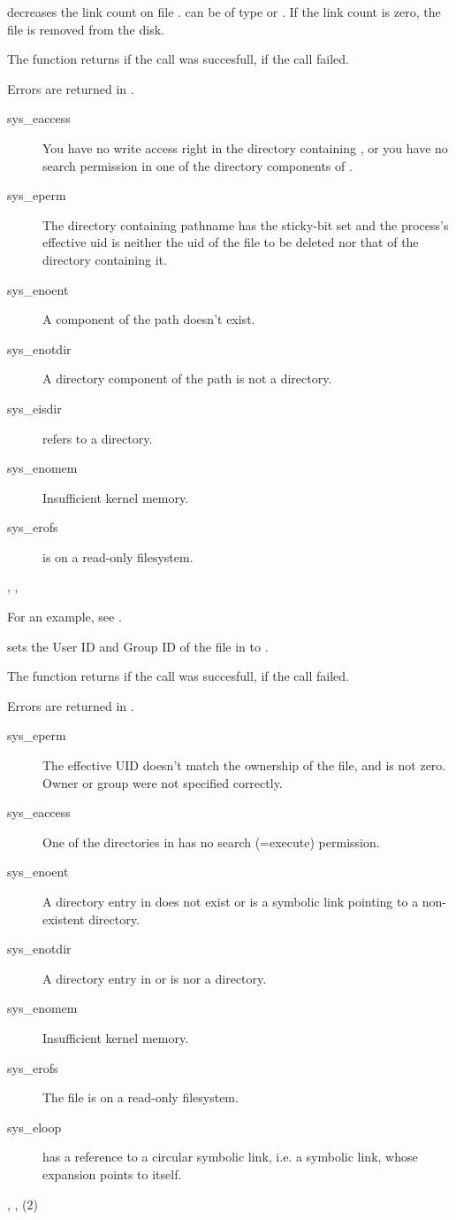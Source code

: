 {
 decreases the link count on file .  can be
of type  or . If the link count is zero, the
file is removed from the disk.

The function returns  if the call was succesfull,  if the call
failed.
}
{ Errors are returned in .
\begin{description}
\item[sys\_eaccess] You have no write access right in the directory
containing , or you have no search permission in one of the
directory components of .
\item[sys\_eperm] The  directory containing pathname has the sticky-bit 
set and the process's effective  uid is neither the uid of the 
file to be deleted nor that of the directory containing it.
\item[sys\_enoent] A component of the path doesn't exist.
\item[sys\_enotdir] A directory component of the path is not a directory.
\item[sys\_eisdir]  refers to a directory.
\item[sys\_enomem] Insufficient kernel memory.
\item[sys\_erofs]  is on a read-only filesystem. 
\end{description}
}
{, ,  }

For an example, see .

{  sets the User ID and Group ID of the file in  to .

The function returns  if the call was succesfull,  if the call
failed.
}
{
Errors are returned in .
\begin{description}
\item[sys\_eperm] The effective UID doesn't match the ownership of the file,
and is not zero. Owner or group were not specified correctly.
\item[sys\_eaccess] One of the directories in  has no
search (=execute) permission.
\item[sys\_enoent] A directory entry in  does
not exist or is a symbolic link pointing to a non-existent directory.
\item[sys\_enotdir] A directory entry in  or  is
nor a directory.
\item[sys\_enomem] Insufficient kernel memory.
\item[sys\_erofs] The file is on a read-only filesystem.
\item[sys\_eloop]  has a reference to a circular
symbolic link, i.e. a symbolic link, whose expansion points to itself.
\end{description}
}
{, , (2)}

